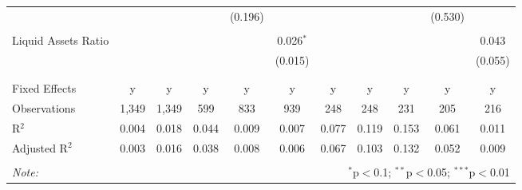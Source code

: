 \begin{table}[!htbp]
\begin{tabular}{@{\extracolsep{5pt}}lcccccccccc}
  &  &  &  & (0.196) &  &  &  &  & (0.530) &  \\ 
  & & & & & & & & & & \\ 
 Liquid Assets Ratio &  &  &  &  & 0.026$^{*}$ &  &  &  &  & 0.043 \\ 
  &  &  &  &  & (0.015) &  &  &  &  & (0.055) \\ 
  & & & & & & & & & & \\ 
\hline \\[-1.8ex] 
Fixed Effects & y & y & y & y & y & y & y & y & y & y \\ 
Observations & 1,349 & 1,349 & 599 & 833 & 939 & 248 & 248 & 231 & 205 & 216 \\ 
R$^{2}$ & 0.004 & 0.018 & 0.044 & 0.009 & 0.007 & 0.077 & 0.119 & 0.153 & 0.061 & 0.011 \\ 
Adjusted R$^{2}$ & 0.003 & 0.016 & 0.038 & 0.008 & 0.006 & 0.067 & 0.103 & 0.132 & 0.052 & 0.009 \\ 
\hline 
\hline \\[-1.8ex] 
\textit{Note:}  & \multicolumn{10}{r}{$^{*}$p$<$0.1; $^{**}$p$<$0.05; $^{***}$p$<$0.01} \\ 
\end{tabular} 
\end{table} 
